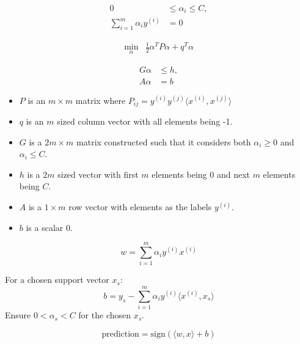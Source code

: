 \documentclass[12pt,a4paper]{article}
\begin{document}

\begin{align*}
0 & \leq \alpha_i \leq C, \\
\sum_{i=1}^{m} \alpha_i y^{(i)} & = 0
\end{align*}


\begin{align*}
\min_{\alpha} & \frac{1}{2} \alpha^T P \alpha + q^T \alpha
\end{align*}


\begin{align*}
G\alpha & \leq h, \\
A\alpha & = b
\end{align*}


\begin{itemize}
\item \( P \) is an \( m \times m \) matrix where \( P_{ij} = y^{(i)} y^{(j)} \langle x^{(i)}, x^{(j)} \rangle \)
\item \( q \) is an \( m \) sized column vector with all elements being -1.
\item \( G \) is a \( 2m \times m \) matrix constructed such that it considers both \( \alpha_i \geq 0 \) and \( \alpha_i \leq C \).
\item \( h \) is a \( 2m \) sized vector with first \( m \) elements being 0 and next \( m \) elements being \( C \).
\item \( A \) is a \( 1 \times m \) row vector with elements as the labels \( y^{(i)} \).
\item \( b \) is a scalar 0.
\end{itemize}


\[ w = \sum_{i=1}^{m} \alpha_i y^{(i)} x^{(i)} \]


For a chosen support vector \( x_s \): \\
\[ b = y_s - \sum_{i=1}^{m} \alpha_i y^{(i)} \langle x^{(i)}, x_s \rangle \]
Ensure \( 0 < \alpha_s < C \) for the chosen \( x_s \).

\[ \text{prediction} = \text{sign}(\langle w, x \rangle + b) \]
\end{document}
